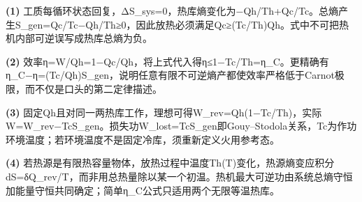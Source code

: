 \par\noindent\textbf{(1)} 工质每循环状态回复，ΔS\_sys=0，热库熵变化为−Qh/Th+Qc/Tc。总熵产生S\_gen=Qc/Tc−Qh/Th≥0，因此放热必须满足Qc≥(Tc/Th)Qh。式中不可把热机内部可逆误写成热库总熵为负。
\par\noindent\textbf{(2)} 效率η=W/Qh=1−Qc/Qh，将上式代入得η≤1−Tc/Th=η\_C。更精确有η\_C−η=(Tc/Qh)S\_gen，说明任意有限不可逆熵产都使效率严格低于Carnot极限，而不仅是口头的第二定律描述。
\par\noindent\textbf{(3)} 固定Qh且对同一两热库工作，理想可得W\_rev=Qh(1−Tc/Th)，实际W=W\_rev−TcS\_gen。损失功W\_lost=TcS\_gen即Gouy–Stodola关系，Tc为作功环境温度；若环境温度不是固定冷库，须重新定义火用参考态。
\par\noindent\textbf{(4)} 若热源是有限热容量物体，放热过程中温度Th(T)变化，热源熵变应积分dS=δQ\_rev/T，而非用总热量除以某一个初温。热机最大可逆功由系统总熵守恒加能量守恒共同确定；简单η\_C公式只适用两个无限等温热库。
